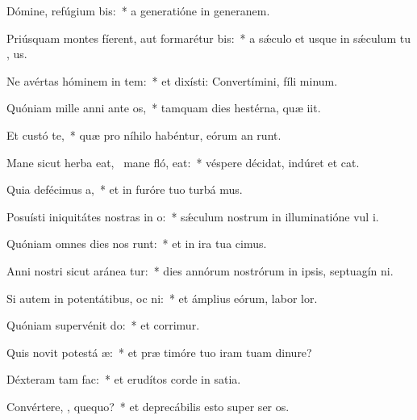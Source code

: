 \item Dómine, refúgium   bis:~* a generatióne in generanem.
\item Priúsquam montes fíerent, aut formarétur   bis:~* a sǽculo et usque in sǽculum tu , us.
\item Ne avértas hóminem in tem:~* et dixísti: Convertímini, fíli minum.
\item Quóniam mille anni ante  os,~* tamquam dies hestérna, quæ iit.
\item Et custó  te,~* quæ pro níhilo habéntur, eórum an runt.
\item Mane sicut herba eat,~\pscross{} mane fló,  eat:~* véspere décidat, indúret et cat.
\item Quia defécimus   a,~* et in furóre tuo turbá mus.
\item Posuísti iniquitátes nostras in  o:~* sǽculum nostrum in illuminatióne vul i.
\item Quóniam omnes dies nos runt:~* et in ira tua cimus.
\item Anni nostri sicut aránea tur:~* dies annórum nostrórum in ipsis, septuagín ni.
\item Si autem in potentátibus, oc ni:~* et ámplius eórum, labor  lor.
\item Quóniam supervénit do:~* et corrimur.
\item Quis novit potestá  æ:~* et præ timóre tuo iram tuam dinure?
\item Déxteram   tam fac:~* et erudítos corde in satia.
\item Convértere, , quequo?~* et deprecábilis esto super ser os.
